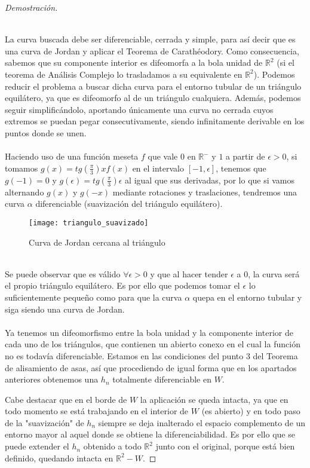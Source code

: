 \begin{proof}[Demostración]
\begin{enumerate}
			\\ La curva buscada debe ser diferenciable, cerrada y simple, para así decir que es una curva de Jordan y aplicar el Teorema de Carathéodory. Como consecuencia, sabemos que su componente interior es difeomorfa a la bola unidad de $\mathbb{R}^2$ (si el teorema de Análisis Complejo lo trasladamos a su equivalente en $\mathbb{R}^2$). Podemos reducir el problema a buscar dicha curva para el entorno tubular de un triángulo equilátero, ya que es difeomorfo al de un triángulo cualquiera. Además, podemos seguir simplificándolo, aportando únicamente una curva no cerrada cuyos extremos se puedan pegar consecutivamente, siendo infinitamente derivable en los puntos donde se unen.\\
			\\ Haciendo uso de una función meseta $f$ que vale $0$ en $\mathbb{R}^-$ y $1$ a partir de $\epsilon > 0$, si tomamos $g(x)=tg(\frac{\pi}{3})xf(x)$ en el intervalo $[-1,\epsilon]$, tenemos que $g(-1)=0$ y $g(\epsilon)=tg(\frac{\pi}{3})\epsilon$  al igual que sus derivadas, por lo que si vamos alternando $g(x)$ y $g(-x)$ mediante rotaciones y traslaciones, tendremos una curva $\alpha$ diferenciable (suavización del triángulo equilátero). \\
			\begin{figure}[h]
  				\centering
  				\texttt{[image: triangulo\_suavizado]}
  				\caption{Curva de Jordan cercana al triángulo}
  				\label{fig:triangulo_suavizado}
			\end{figure}
			\\ Se puede observar que es válido $\forall \epsilon > 0$ y que al hacer tender $\epsilon$ a $0$, la curva será el propio triángulo equilátero. Es por ello que podemos tomar el $\epsilon$ lo suficientemente pequeño como para que la curva $\alpha$ quepa en el entorno tubular y siga siendo una curva de Jordan. \\
			\\ Ya tenemos un difeomorfismo entre la bola unidad y la componente interior de cada uno de los triángulos, que contienen un abierto conexo en el cual la función no es todavía diferenciable. Estamos en las condiciones del punto 3 del Teorema de alisamiento de asas, así que procediendo de igual forma que en los apartados anteriores obtenemos una $h_n$ totalmente diferenciable en $W$.
		\end{enumerate}
		
		Cabe destacar que en el borde de $W$ la aplicación se queda intacta, ya que en todo momento se está trabajando en el interior de $W$ (es abierto) y en todo paso de la "suavización" de $h_n$ siempre se deja inalterado el espacio complemento de un entorno mayor al aquel donde se obtiene la diferenciabilidad. Es por ello que se puede extender el $h_n$ obtenido a todo $\mathbb{R}^2$ junto con el original, porque está bien definido, quedando intacta en $\mathbb{R}^2-W$. 
	\end{proof}

